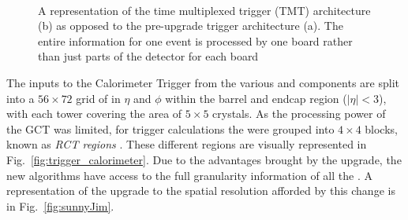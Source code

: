 \begin{figure}
  \centering
  ~~
   \\
  \caption{A representation of the time multiplexed trigger (TMT)
  architecture (b) as opposed to the pre-upgrade trigger architecture
  (a). The entire information for one event is processed by one board
  rather than just parts of the detector for each board \cite{1748-0221-9-10-C10034}}
  \label{fig:tmt}
\end{figure}

The inputs to the Calorimeter Trigger from the various \ECAL and \HCAL
components are split into a $56\times 72$ grid of \TTs in $\eta$ and
$\phi$ within the barrel and endcap region ($|\eta|<3$), with each
tower covering the area of $5\times5$ \ECAL crystals.  As the
processing power of the \ac{GCT} was limited, for trigger calculations
the \TTs were grouped into $4\times4$ blocks, known as \emph{\ac{RCT}
regions} \cite{Khachatryan:2016bia}. These different regions are
visually represented in Fig.~\ref{fig:trigger_calorimeter}. Due to the
advantages brought by the upgrade, the new algorithms have access
to the full granularity information of all the \TTs. A representation
of the upgrade to the spatial resolution afforded by this change is
in Fig.~\ref{fig:sunnyJim}.


